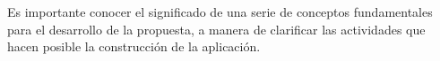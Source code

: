 


Es importante conocer el significado de una serie de conceptos fundamentales para el desarrollo de la propuesta, a manera de clarificar las actividades que hacen posible la construcción de la aplicación.



\clearpage
